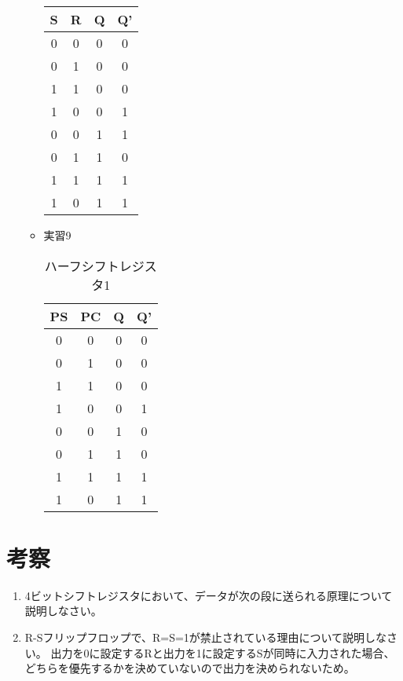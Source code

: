 \documentclass[dvipdfmx]{jsarticle}
\begin{document}
\begin{enumerate}
\begin{itemize}
\begin{table}[H]
\begin{tabular}{|c|c|c|c|}
								S & R & Q & Q'\\ \hline
								0 & 0 & 0 & 0 \\ \hline
								0 & 1 & 0 & 0 \\ \hline
								1 & 1 & 0 & 0 \\ \hline
								1 & 0 & 0 & 1 \\ \hline
								0 & 0 & 1 & 1 \\ \hline
								0 & 1 & 1 & 0 \\ \hline
								1 & 1 & 1 & 1 \\ \hline
								1 & 0 & 1 & 1 \\ \hline
							\end{tabular}
						\end{table}
					\item 実習9
						\begin{table}[H]
							\center
							\caption{ハーフシフトレジスタ1}
							\begin{tabular}{|c|c|c|c|}
								\hline
								PS & PC & Q & Q'\\ \hline
								0 & 0 & 0 & 0 \\ \hline
								0 & 1 & 0 & 0 \\ \hline
								1 & 1 & 0 & 0 \\ \hline
								1 & 0 & 0 & 1 \\ \hline
								0 & 0 & 1 & 0 \\ \hline
								0 & 1 & 1 & 0 \\ \hline
								1 & 1 & 1 & 1 \\ \hline
								1 & 0 & 1 & 1 \\ \hline
							\end{tabular}
						\end{table}
				\end{itemize}
		\end{enumerate}
	\section{考察}
		\begin{enumerate}
			\item 4ビットシフトレジスタにおいて、データが次の段に送られる原理について説明しなさい。\\
				
			\item R-Sフリップフロップで、R=S=1が禁止されている理由について説明しなさい。
				出力を0に設定するRと出力を1に設定するSが同時に入力された場合、どちらを優先するかを決めていないので出力を決められないため。
		\end{enumerate}
\end{document}
